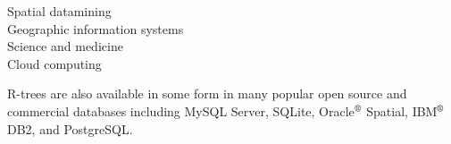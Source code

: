 \begin{description}
	\item[Spatial datamining]
	
	\item[Geographic information systems]
	\item[Science and medicine]
	\item[Cloud computing]
\end{description}

R-trees are also available in some form in many popular open source and 
commercial databases including MySQL Server, SQLite, Oracle$\textsuperscript{\textregistered}$ Spatial, IBM$\textsuperscript{\textregistered}$ DB2, and 
PostgreSQL. 
